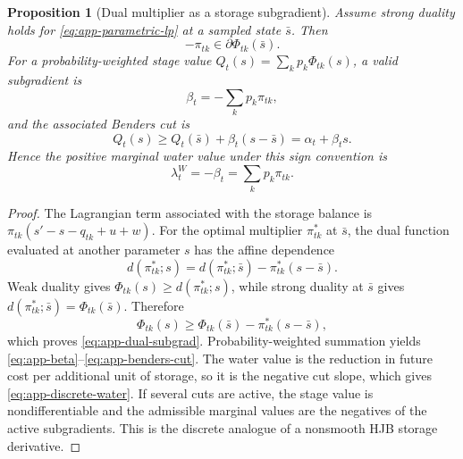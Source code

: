 \documentclass[11pt,a4paper]{article}
\newtheorem{proposition}{Proposition}
\begin{document}
\begin{proposition}[Dual multiplier as a storage subgradient]\label{prop:app-dual}
Assume strong duality holds for \eqref{eq:app-parametric-lp} at a sampled state
$\bar s$. Then
\begin{equation}
 -\pi_{tk}\in\partial\Phi_{tk}(\bar s).
 \label{eq:app-dual-subgrad}
\end{equation}
For a probability-weighted stage value
$Q_t(s)=\sum_kp_k\Phi_{tk}(s)$, a valid subgradient is
\begin{equation}
 \beta_t=-\sum_kp_k\pi_{tk},
 \label{eq:app-beta}
\end{equation}
and the associated Benders cut is
\begin{equation}
 Q_t(s)\ge Q_t(\bar s)+\beta_t(s-\bar s)
 =\alpha_t+\beta_t s.
 \label{eq:app-benders-cut}
\end{equation}
Hence the positive marginal water value under this sign convention is
\begin{equation}
 \lambda_t^W=-\beta_t=\sum_kp_k\pi_{tk}.
 \label{eq:app-discrete-water}
\end{equation}
\end{proposition}

\begin{proof}
The Lagrangian term associated with the storage balance is
$\pi_{tk}(s'-s-q_{tk}+u+w)$. For the optimal multiplier
$\pi_{tk}^*$ at $\bar s$, the dual function evaluated at another parameter $s$
has the affine dependence
\begin{equation}
 d(\pi_{tk}^*;s)=d(\pi_{tk}^*;\bar s)
 -\pi_{tk}^*(s-\bar s).
 \end{equation}
Weak duality gives $\Phi_{tk}(s)\ge d(\pi_{tk}^*;s)$, while strong duality at
$\bar s$ gives $d(\pi_{tk}^*;\bar s)=\Phi_{tk}(\bar s)$. Therefore
\begin{equation}
 \Phi_{tk}(s)\ge\Phi_{tk}(\bar s)
 -\pi_{tk}^*(s-\bar s),
\end{equation}
which proves \eqref{eq:app-dual-subgrad}. Probability-weighted summation yields
\eqref{eq:app-beta}--\eqref{eq:app-benders-cut}. The water value is the reduction
in future cost per additional unit of storage, so it is the negative cut slope,
which gives \eqref{eq:app-discrete-water}. If several cuts are active, the stage
value is nondifferentiable and the admissible marginal values are the negatives of
the active subgradients. This is the discrete analogue of a nonsmooth HJB storage
derivative.
\end{proof}
\end{document}
